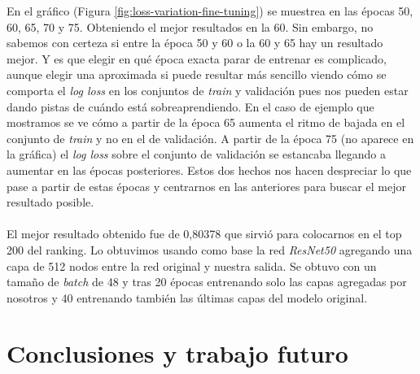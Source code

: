 En el gráfico (Figura \ref{fig:loss-variation-fine-tuning}) se muestrea en las épocas 50, 60, 65, 70 y 75. Obteniendo el mejor resultados en la 60. Sin embargo, no sabemos con certeza si entre la época 50 y 60 o la 60 y 65 hay un resultado mejor. Y es que elegir en qué época exacta parar de entrenar es complicado, aunque elegir una aproximada si puede resultar más sencillo viendo cómo se comporta el \textit{log loss} en los conjuntos de \textit{train} y validación pues nos pueden estar dando pistas de cuándo está sobreaprendiendo. En el caso de ejemplo que mostramos se ve cómo a partir de la época 65 aumenta el ritmo de bajada en el conjunto de \textit{train} y no en el de validación. A partir de la época 75 (no aparece en la gráfica) el \textit{log loss} sobre el conjunto de validación se estancaba llegando a aumentar en las épocas posteriores. Estos dos hechos nos hacen despreciar lo que pase a partir de estas épocas y centrarnos en las anteriores para buscar el mejor resultado posible.
\\ \\
El mejor resultado obtenido fue de 0,80378 que sirvió para colocarnos en el top 200 del ranking. Lo obtuvimos usando como base la red \textit{ResNet50} agregando una capa de 512 nodos entre la red original y nuestra salida. Se obtuvo con un tamaño de \textit{batch} de 48 y tras 20 épocas entrenando solo las capas agregadas por nosotros y 40 entrenando también las últimas capas del modelo original.

\section{Conclusiones y trabajo futuro}

